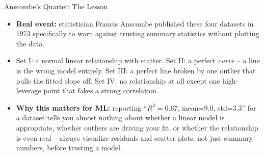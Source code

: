 \begin{frame}{Anscombe's Quartet: The Lesson}
\begin{itemize}
  \item \textbf{Real event:} statistician Francis Anscombe published these four datasets in 1973 specifically to warn against trusting summary statistics without plotting the data.
  \pause
  \item Set I: a normal linear relationship with scatter. Set II: a perfect \emph{curve} -- a line is the wrong model entirely. Set III: a perfect line broken by one outlier that pulls the fitted slope off. Set IV: no relationship at all except one high-leverage point that fakes a strong correlation.
  \pause
  \item \textbf{Why this matters for ML:} reporting ``$R^2=0.67$, mean=9.0, std=3.3'' for a dataset tells you almost nothing about whether a linear model is appropriate, whether outliers are driving your fit, or whether the relationship is even real -- always visualize residuals and scatter plots, not just summary numbers, before trusting a model.
\end{itemize}
\end{frame}
